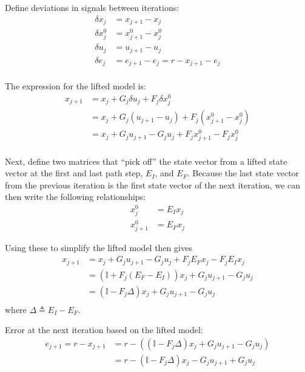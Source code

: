 \documentclass[legalpaper,landscape]{article}
\begin{document}
Define deviations in signals between iterations:
\begin{align}
\delta x_j & = x_{j+1} - x_j\\
\delta x_j^0 & = x_{j+1}^0 - x_j^0\\
\delta u_j & = u_{j+1} - u_j\\
\delta e_j & = e_{j+1} - e_j = r - x_{j+1} - e_j\\
\end{align}

The expression for the lifted model is:
\begin{align}
x_{j+1} & = x_{j} + G_j \delta u_{j}           + F_j \delta x^0_{j}\\
		& = x_{j} + G_j \left(u_{j+1}-u_j\right) + F_j \left(x^0_{j+1}-x^0_j\right)\\
		& = x_{j} + G_j u_{j+1} - G_j u_j        + F_j x^0_{j+1} - F_j x^0_j\\
\end{align}

Next, define two matrices that ``pick off'' the state vector from a lifted state vector at the first and last path step, $E_I$, and $E_F$.  Because the last state vector from the previous iteration is the first state vector of the next iteration, we can then write the following relationships:
\begin{align}
x_{j}^0 & = E_I x_j \\
x_{j+1}^0 & = E_F x_j
\end{align}

Using these to simplify the lifted model then gives
\begin{align}
x_{j+1} & = x_{j} + G_j u_{j+1} - G_j u_j        + F_j E_F x_j - F_j E_I x_j\\
        & = \left(\mathbb{I} +F_j \left(E_F - E_I\right) \right)x_{j} + G_j u_{j+1} - G_j u_j\\
        & = \left(\mathbb{I} - F_j \Delta \right)x_{j} + G_j u_{j+1} - G_j u_j\\
\end{align}
where $\Delta \triangleq E_I-E_F$.


Error at the next iteration based on the lifted model:
\begin{align}
e_{j+1} = r - x_{j+1} & = r - \left(\left(\mathbb{I} - F_j \Delta \right)x_{j} + G_j u_{j+1} - G_j u_j\right)\\
					  & = r - \left(\mathbb{I} - F_j \Delta \right)x_{j} - G_j u_{j+1} + G_j u_j\\
\end{align}
\end{document}
